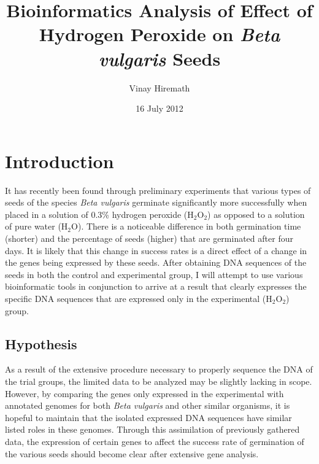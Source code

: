 \documentclass{article}
\begin{document}
\title{Bioinformatics Analysis of Effect of Hydrogen Peroxide on \emph{Beta vulgaris} Seeds}
\author{Vinay Hiremath}
\date{16 July 2012}
\maketitle
\section{Introduction}
	It has recently been found through preliminary experiments that various types of seeds of the species \emph{Beta vulgaris} germinate significantly more successfully when placed in a solution of 0.3\% hydrogen peroxide (H$_{2}$O$_{2}$) as opposed to a solution of pure water (H$_{2}$O). There is a noticeable difference in both germination time (shorter) and the percentage of seeds (higher) that are germinated after four days. It is likely that this change in success rates is a direct effect of a change in the genes being expressed by these seeds. After obtaining DNA sequences of the seeds in both the control and experimental group, I will attempt to use various bioinformatic tools in conjunction to arrive at a result that clearly expresses the specific DNA sequences that are expressed only in the experimental (H$_{2}$O$_{2}$) group.
	\subsection{Hypothesis}
	As a result of the extensive procedure necessary to properly sequence the DNA of the trial groups, the limited data to be analyzed may be slightly lacking in scope. However, by comparing the genes only expressed in the experimental with annotated genomes for both \emph{Beta vulgaris} and other similar organisms, it is hopeful to maintain that the isolated expressed DNA sequences have similar listed roles in these genomes. Through this assimilation of previously gathered data, the expression of certain genes to affect the success rate of germination of the various seeds should become clear after extensive gene analysis.
\end{document}
